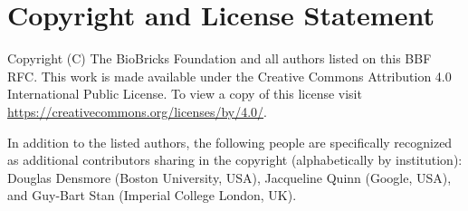 \section{Copyright and License Statement}


Copyright (C) The BioBricks Foundation and all authors listed on this BBF RFC. This work is made available under the Creative Commons Attribution 4.0 International Public License. To view a copy of this license visit \href{https://creativecommons.org/licenses/by/4.0/}{https://creativecommons.org/licenses/by/4.0/}.

In addition to the listed authors, the following people are specifically recognized as additional contributors sharing in the copyright (alphabetically by institution):
Douglas Densmore (Boston University, USA), 
Jacqueline Quinn (Google, USA), and
Guy-Bart Stan (Imperial College London, UK).
